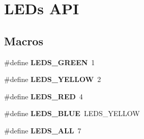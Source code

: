 \hypertarget{group__leds}{}\section{L\+E\+Ds A\+P\+I}
\label{group__leds}
\subsection*{Macros}
\begin{DoxyCompactItemize}
\item 
\hypertarget{group__leds_ga23896f3557234decaa9414d3592e6aae}{}\#define {\bfseries L\+E\+D\+S\+\_\+\+G\+R\+E\+E\+N}~1\label{group__leds_ga23896f3557234decaa9414d3592e6aae}

\item 
\hypertarget{group__leds_gaeeb2388e5fb41bd26f5b6192e7d47d2b}{}\#define {\bfseries L\+E\+D\+S\+\_\+\+Y\+E\+L\+L\+O\+W}~2\label{group__leds_gaeeb2388e5fb41bd26f5b6192e7d47d2b}

\item 
\hypertarget{group__leds_ga5005bb516b2e0a4d6f18b343f9fe212f}{}\#define {\bfseries L\+E\+D\+S\+\_\+\+R\+E\+D}~4\label{group__leds_ga5005bb516b2e0a4d6f18b343f9fe212f}

\item 
\hypertarget{group__leds_ga4db9cce6e6b0910eb928d93e0d1dafd4}{}\#define {\bfseries L\+E\+D\+S\+\_\+\+B\+L\+U\+E}~L\+E\+D\+S\+\_\+\+Y\+E\+L\+L\+O\+W\label{group__leds_ga4db9cce6e6b0910eb928d93e0d1dafd4}

\item 
\hypertarget{group__leds_ga64c8bcabbf441dd1b338b1ed218f359c}{}\#define {\bfseries L\+E\+D\+S\+\_\+\+A\+L\+L}~7\label{group__leds_ga64c8bcabbf441dd1b338b1ed218f359c}

\end{DoxyCompactItemize}
